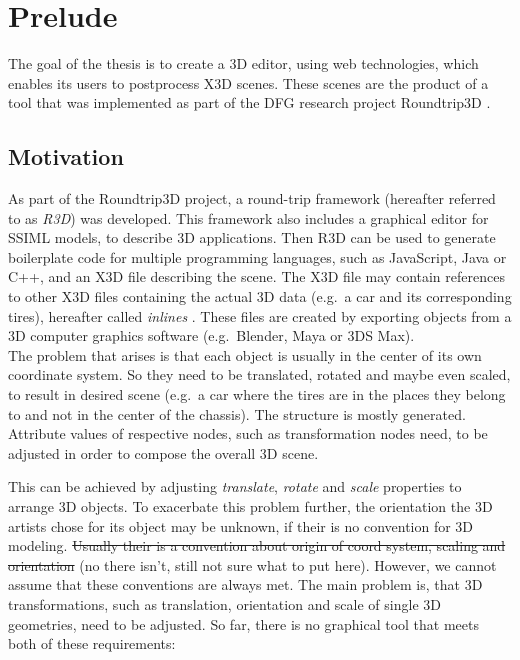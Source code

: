 
\section{Prelude}
\label{sec:Prelude}

The goal of the thesis is to create a 3D editor, using web technologies,
which enables its users to postprocess \gls{X3D} scenes. These scenes are the
product of a tool that was implemented as part of the DFG research
project \gls{Roundtrip3D} \cite{Jung:2015:SDA:2802768.2802837}.
\subsection{Motivation}\label{motivation}

As part of the Roundtrip3D project, a round-trip framework (hereafter
referred to as \emph{R3D}) was developed. This framework also includes a
graphical editor for SSIML models, to describe 3D applications. Then
\gls{R3D} can be used to generate boilerplate code for multiple programming
languages, such as JavaScript, Java or C++, and an \gls{X3D} file describing
the scene. The \gls{X3D} file may contain references to other \gls{X3D} files
containing the actual 3D data (e.g.~a car and its corresponding tires),
hereafter called \emph{inlines} . These files are created by exporting
objects from a 3D computer graphics software (e.g.~Blender,
Maya or 3DS Max).\\
The problem that arises is that each object is usually in the center of
its own coordinate system. So they need to be translated, rotated and
maybe even scaled, to result in desired scene (e.g.~a car where the tires
are in the places they belong to and not in the center of the chassis).
The structure is mostly generated. Attribute values of respective nodes,
such as transformation nodes need, to be adjusted in order to compose the
overall 3D scene.


This can be achieved by adjusting \emph{translate}, \emph{rotate} and
\emph{scale} properties to arrange 3D objects. To exacerbate this
problem further, the orientation the 3D artists chose for its object may be unknown, if their is no convention for 3D modeling. \sout{Usually
their is a convention about origin of coord system, scaling and
orientation} (no there isn't, still not sure what to put here). However, we cannot assume that these
conventions are always met. The main problem is, that 3D
transformations, such as translation, orientation and scale of single 3D
geometries, need to be adjusted. So far, there is no graphical tool that
meets both of these requirements:

